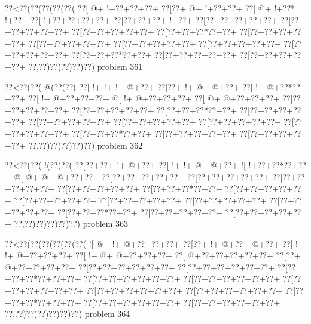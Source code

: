 \vbox{\vbox{\goo
\0??<\0??(\0??(\0??(\0??(\0??(
\0??[\- @+\- !+\0??+\0??+\0??+
\0??[\0??+\- @+\- !+\0??+\0??+
\0??[\- @+\- !+\0??*\- !+\0??+
\0??[\- !+\0??+\0??+\0??+\0??+
\0??[\0??+\0??+\0??+\- !+\0??+
\0??[\0??+\0??+\0??+\0??+\0??+
\0??[\0??+\0??+\0??+\0??+\0??+
\0??[\0??+\0??+\0??+\0??+\0??+
\0??[\0??+\0??+\0??*\0??+\0??+
\0??[\0??+\0??+\0??+\0??+\0??+
\0??[\0??+\0??+\0??+\0??+\0??+
\0??[\0??+\0??+\0??+\0??+\0??+
\0??[\0??+\0??+\0??+\0??+\0??+
\0??[\0??+\0??+\0??+\0??+\0??+
\0??[\0??+\0??+\0??*\0??+\0??+
\0??[\0??+\0??+\0??+\0??+\0??+
\0??[\0??+\0??+\0??+\0??+\0??+
\0??,\0??)\0??)\0??)\0??)\0??)
}
\hfil problem 361\hfil\break
}

\vbox{\vbox{\goo
\0??<\0??(\0??(\- @(\0??(\0??(
\0??[\- !+\- !+\- !+\- @+\0??+
\0??[\0??+\- !+\- @+\- @+\0??+
\0??[\- !+\- @+\0??*\0??+\0??+
\0??[\- !+\- @+\0??+\0??+\0??+
\- @[\- !+\- @+\0??+\0??+\0??+
\0??[\- @+\- @+\0??+\0??+\0??+
\0??[\0??+\0??+\0??+\0??+\0??+
\0??[\0??+\0??+\0??+\0??+\0??+
\0??[\0??+\0??+\0??*\0??+\0??+
\0??[\0??+\0??+\0??+\0??+\0??+
\0??[\0??+\0??+\0??+\0??+\0??+
\0??[\0??+\0??+\0??+\0??+\0??+
\0??[\0??+\0??+\0??+\0??+\0??+
\0??[\0??+\0??+\0??+\0??+\0??+
\0??[\0??+\0??+\0??*\0??+\0??+
\0??[\0??+\0??+\0??+\0??+\0??+
\0??[\0??+\0??+\0??+\0??+\0??+
\0??,\0??)\0??)\0??)\0??)\0??)
}
\hfil problem 362\hfil\break
}

\vbox{\vbox{\goo
\0??<\0??(\0??(\- !(\0??(\0??(
\0??[\0??+\0??+\- !+\- @+\0??+
\0??[\- !+\- !+\- @+\- @+\0??+
\- ![\- !+\0??+\0??*\0??+\0??+
\- @[\- @+\- @+\- @+\0??+\0??+
\0??[\0??+\0??+\0??+\0??+\0??+
\0??[\0??+\0??+\0??+\0??+\0??+
\0??[\0??+\0??+\0??+\0??+\0??+
\0??[\0??+\0??+\0??+\0??+\0??+
\0??[\0??+\0??+\0??*\0??+\0??+
\0??[\0??+\0??+\0??+\0??+\0??+
\0??[\0??+\0??+\0??+\0??+\0??+
\0??[\0??+\0??+\0??+\0??+\0??+
\0??[\0??+\0??+\0??+\0??+\0??+
\0??[\0??+\0??+\0??+\0??+\0??+
\0??[\0??+\0??+\0??*\0??+\0??+
\0??[\0??+\0??+\0??+\0??+\0??+
\0??[\0??+\0??+\0??+\0??+\0??+
\0??,\0??)\0??)\0??)\0??)\0??)
}
\hfil problem 363\hfil\break
}

\vbox{\vbox{\goo
\0??<\0??(\0??(\0??(\0??(\0??(\0??(
\- ![\- @+\- !+\- @+\0??+\0??+\0??+
\0??[\0??+\- !+\- @+\0??+\- @+\0??+
\0??[\- !+\- !+\- @+\0??+\0??+\0??+
\0??[\- !+\- @+\- @+\0??+\0??+\0??+
\0??[\- @+\0??+\0??+\0??+\0??+\0??+
\0??[\0??+\- @+\0??+\0??+\0??+\0??+
\0??[\0??+\0??+\0??+\0??+\0??+\0??+
\0??[\0??+\0??+\0??+\0??+\0??+\0??+
\0??[\0??+\0??+\0??*\0??+\0??+\0??+
\0??[\0??+\0??+\0??+\0??+\0??+\0??+
\0??[\0??+\0??+\0??+\0??+\0??+\0??+
\0??[\0??+\0??+\0??+\0??+\0??+\0??+
\0??[\0??+\0??+\0??+\0??+\0??+\0??+
\0??[\0??+\0??+\0??+\0??+\0??+\0??+
\0??[\0??+\0??+\0??*\0??+\0??+\0??+
\0??[\0??+\0??+\0??+\0??+\0??+\0??+
\0??[\0??+\0??+\0??+\0??+\0??+\0??+
\0??,\0??)\0??)\0??)\0??)\0??)\0??)
}
\hfil problem 364\hfil\break
}

